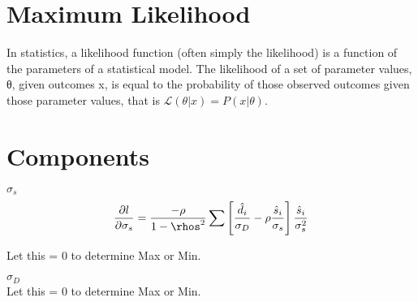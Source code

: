 \section{Maximum Likelihood}

In statistics, a likelihood function (often simply the likelihood) is a function of the parameters of a statistical model. 
The likelihood of a set of parameter values, θ, given outcomes x, is equal to the probability of those 
observed outcomes given those parameter values, that is $\mathcal{L}(\theta |x) = P(x | \theta)$.

\section{Components}
$\sigma_s$ \\

\[ \frac{ \partial l}{\partial \sigma_s}  = \frac{-\rho}{1-\rhos^2} \sum \left[ \frac{\hat{d}_i}{\sigma_D}  -\rho \frac{\hat{s}_i}{\sigma_s} \right] \frac{\hat{s}_i}{\sigma^2_s} \]

Let this = 0 to determine Max or Min.





$\sigma_D$ \\






Let this = 0 to determine Max or Min.

